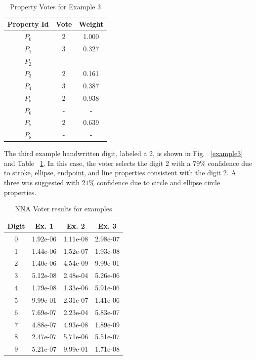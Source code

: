 \documentclass[conference]{IEEEtran}
\begin{document}
\begin{table}[htbp]
\caption{Property Votes for Example 3}
\centering
\begin{tabular}{| c | c | c |}
\hline
 Property Id & Vote & Weight \\
\hline\hline
$P_0$ & 2 & 1.000 \\ 
\hline
$P_1$ & 3 & 0.327 \\
\hline
$P_2$ & - & - \\
\hline
$P_3$ & 2 & 0.161 \\
\hline
$P_4$ & 3 & 0.387 \\
\hline
$P_5$ & 2 & 0.938 \\
\hline
$P_6$ & - & - \\
\hline
$P_7$ & 2 & 0.639 \\
\hline
$P_8$ & - & - \\
\hline
\end{tabular}
\label{table:example3}
\end{table}

The third example handwritten digit, labeled a 2, is shown in Fig. ~\ref{example3} and Table ~\ref{table:example3}.  In this case,  the voter selects the digit 2 with a $79\%$ confidence due to stroke, ellipse, endpoint, and line properties consistent with the digit 2.  A three was suggested with $21\%$ confidence due to circle and ellipse circle properties.

\begin{table}[htbp]
\caption{NNA Voter results for examples}
\centering
\begin{tabular}{| c | c | c | c |}
\hline
 Digit & Ex. 1 & Ex. 2 & Ex. 3 \\
\hline\hline
0 & 1.92e-06 & 1.11e-08 & 2.98e-07\\ 
\hline
1 & 1.44e-06 & 1.52e-07 & 1.93e-08 \\
\hline
2 & 1.40e-06 & 4.54e-09 & 9.99e-01 \\
\hline
3 & 5.12e-08 & 2.48e-04 & 5.26e-06 \\
\hline
4 & 1.79e-08 & 1.33e-06 & 5.91e-06 \\
\hline
5 & 9.99e-01 & 2.31e-07 & 1.41e-06 \\
\hline
6 & 7.69e-07 & 2.23e-04 & 5.83e-07 \\
\hline
7 & 4.88e-07 & 4.93e-08 & 1.89e-09 \\
\hline
8 & 2.47e-07 & 5.71e-06 & 5.51e-07 \\
\hline
9 & 5.21e-07 & 9.99e-01 & 1.71e-08 \\
\hline
\end{tabular}
\label{table:nnavoter}
\end{table}
\end{document}
